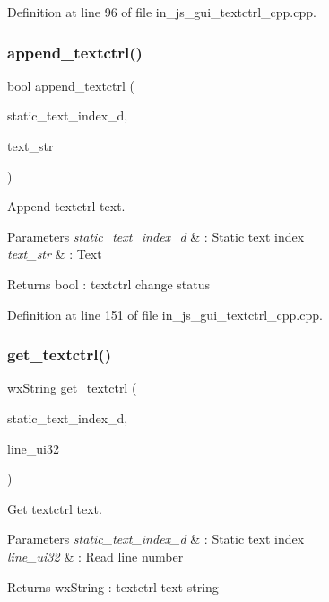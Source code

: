 Definition at line 96 of file in\+\_\+js\+\_\+gui\+\_\+textctrl\+\_\+cpp.\+cpp.

\mbox{\label{group___static__text_gaba651e54d1327a905a653c0989a41f0e}} 
\subsubsection{append\_textctrl()}
{\footnotesize\ttfamily bool append\+\_\+textctrl (\begin{DoxyParamCaption}\item[{double}]{static\+\_\+text\+\_\+index\+\_\+d,  }\item[{wx\+String}]{text\+\_\+str }\end{DoxyParamCaption})}



Append textctrl text. 


\begin{DoxyParams}{Parameters}
{\em static\+\_\+text\+\_\+index\+\_\+d} & \+: Static text index \\
\hline
{\em text\+\_\+str} & \+: Text \\
\hline
\end{DoxyParams}
\begin{DoxyReturn}{Returns}
bool \+: textctrl change status 
\end{DoxyReturn}


Definition at line 151 of file in\+\_\+js\+\_\+gui\+\_\+textctrl\+\_\+cpp.\+cpp.

\mbox{\label{group___static__text_ga183019d50ebf23bce6ec269e6de3e2e2}} 
\subsubsection{get\_textctrl()}
{\footnotesize\ttfamily wx\+String get\+\_\+textctrl (\begin{DoxyParamCaption}\item[{double}]{static\+\_\+text\+\_\+index\+\_\+d,  }\item[{uint32\+\_\+t}]{line\+\_\+ui32 }\end{DoxyParamCaption})}



Get textctrl text. 


\begin{DoxyParams}{Parameters}
{\em static\+\_\+text\+\_\+index\+\_\+d} & \+: Static text index \\
\hline
{\em line\+\_\+ui32} & \+: Read line number \\
\hline
\end{DoxyParams}
\begin{DoxyReturn}{Returns}
wx\+String \+: textctrl text string 
\end{DoxyReturn}


